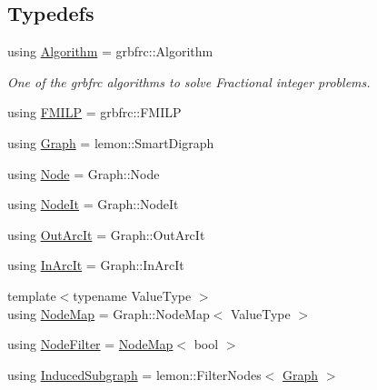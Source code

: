 \subsection*{Typedefs}
\begin{DoxyCompactItemize}
\item 
using \hyperlink{namespacederegnet_ad59156f873b7ab02d384164b900cd874}{Algorithm} = grbfrc\+::\+Algorithm
\begin{DoxyCompactList}\small\item\em One of the grbfrc algorithms to solve Fractional integer problems. \end{DoxyCompactList}\item 
using \hyperlink{namespacederegnet_a31759ad43b8b9641205bcf69b09f10c5}{F\+M\+I\+LP} = grbfrc\+::\+F\+M\+I\+LP
\item 
using \hyperlink{namespacederegnet_a55b76c55bbabc682cbc61f8b9948799e}{Graph} = lemon\+::\+Smart\+Digraph
\item 
using \hyperlink{namespacederegnet_a744bad34f2de9856d36715a445f027f3}{Node} = Graph\+::\+Node
\item 
using \hyperlink{namespacederegnet_ac34314e1b5f456fc6d1bb9d96316de4a}{Node\+It} = Graph\+::\+Node\+It
\item 
using \hyperlink{namespacederegnet_a253cef939ea250e4cc0c967cd0117853}{Out\+Arc\+It} = Graph\+::\+Out\+Arc\+It
\item 
using \hyperlink{namespacederegnet_aed58be361aeda4ef7a9eaca2731ba830}{In\+Arc\+It} = Graph\+::\+In\+Arc\+It
\item 
{\footnotesize template$<$typename Value\+Type $>$ }\\using \hyperlink{namespacederegnet_ae102b707ae1d6f83c639ece5e0dd5658}{Node\+Map} = Graph\+::\+Node\+Map$<$ Value\+Type $>$
\item 
using \hyperlink{namespacederegnet_a50db1f8fc7c6a954d825d9e1ed9ad302}{Node\+Filter} = \hyperlink{namespacederegnet_ae102b707ae1d6f83c639ece5e0dd5658}{Node\+Map}$<$ bool $>$
\item 
using \hyperlink{namespacederegnet_ad1e0ad2af7b91e41fc1d8a15a1da5041}{Induced\+Subgraph} = lemon\+::\+Filter\+Nodes$<$ \hyperlink{namespacederegnet_a55b76c55bbabc682cbc61f8b9948799e}{Graph} $>$
\end{DoxyCompactItemize}

